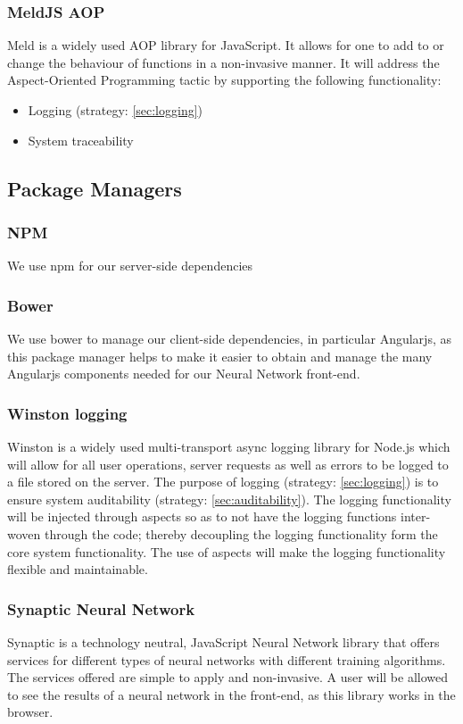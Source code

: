 \subsubsection{MeldJS AOP}
Meld is a widely used AOP library for JavaScript. It allows for one to add to or change the behaviour of functions in a  non-invasive manner. It will address the Aspect-Oriented Programming tactic by supporting the following functionality:
\begin{itemize}
	\item Logging (strategy: \ref{sec:logging})
	\item System traceability				
\end{itemize}

\subsection{Package Managers}
\subsubsection{NPM}
We use npm for our server-side dependencies
\subsubsection{Bower}
We use bower to manage our client-side dependencies, in particular Angularjs, as this package manager helps to make it easier to obtain and manage the many Angularjs components needed for our Neural Network front-end.


\subsubsection{Winston logging}
Winston is a widely used multi-transport async logging library for Node.js which will allow for all user operations, server requests as well as errors to be logged to a file stored on the server. The purpose of logging (strategy: \ref{sec:logging}) is to ensure system auditability (strategy: \ref{sec:auditability}). The logging functionality will be injected through aspects so as to not have the logging functions inter-woven through the code; thereby decoupling the logging functionality form the core system functionality. The use of aspects will make the logging functionality flexible and maintainable.


\subsubsection{Synaptic Neural Network}
Synaptic is a technology neutral, JavaScript Neural Network library that offers services for different types of neural networks with different training algorithms. The services offered are simple to apply and non-invasive. A user will be allowed to see the results of a neural network in the front-end, as this library works in the browser.







